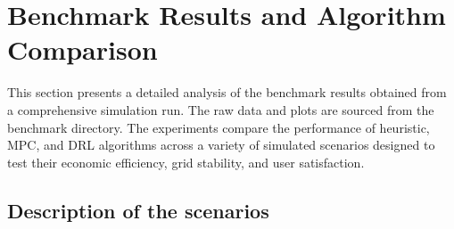 \section{Benchmark Results and Algorithm Comparison}
\label{sec:benchmark_results}

This section presents a detailed analysis of the benchmark results obtained from a comprehensive simulation run. The raw data and plots are sourced from the benchmark directory. The experiments compare the performance of heuristic, MPC, and DRL algorithms across a variety of simulated scenarios designed to test their economic efficiency, grid stability, and user satisfaction.


\subsection{Description of the scenarios}

